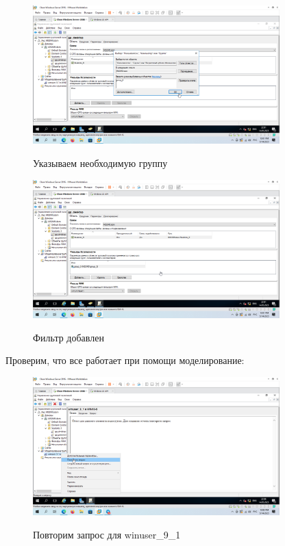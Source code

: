 \documentclass[a4paper]{article}
\begin{document}
  \begin{figure}[H]
    \centering
    \includegraphics[width=0.85\textwidth]{5_0165}
    \label{img:165}
    \caption{Указываем необходимую группу}
  \end{figure}

  \begin{figure}[H]
    \centering
    \includegraphics[width=0.85\textwidth]{5_0166}
    \label{img:166}
    \caption{Фильтр добавлен}
  \end{figure}

  Проверим, что все работает при помощи моделирование:
  
  \begin{figure}[H]
    \centering
    \includegraphics[width=0.85\textwidth]{5_0170}
    \label{img:170}
    \caption{Повторим запрос для winuser\_9\_1}
  \end{figure}
\end{document}
